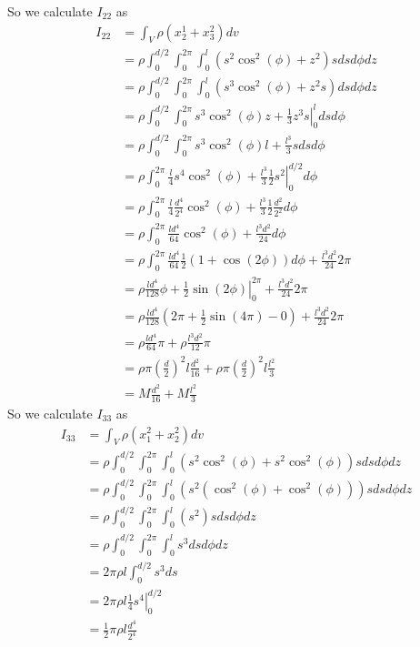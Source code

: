 \documentclass[11pt]{article}
\numberwithin{equation}{section}
\begin{document}
\begin{enumerate}[(a)]
So we calculate $I_{22}$ as
\begin{align*}
I_{22} &= \int_V\rho(x^1_2+x^2_3)dv\\
&= \rho\int_0^{d/2}\int_0^{2\pi}\int_0^l(s^2\cos^2(\phi)+z^2)sdsd\phi dz\\
&= \rho\int_0^{d/2}\int_0^{2\pi}\int_0^l(s^3\cos^2(\phi)+z^2s)dsd\phi dz\\
&= \rho\int_0^{d/2}\int_0^{2\pi}\left.s^3\cos^2(\phi)z+\frac{1}{3}z^3s\right|_0^ldsd\phi\\
&= \rho\int_0^{d/2}\int_0^{2\pi}\left.s^3\cos^2(\phi)l+\frac{l^3}{3}s\right.dsd\phi\\
&= \rho\int_0^{2\pi}\left.\frac{l}{4}s^4\cos^2(\phi)+\frac{l^3}{3}\frac{1}{2}s^2\right|_0^{d/2}d\phi\\
&= \rho\int_0^{2\pi}\left.\frac{l}{4}\frac{d^4}{2^4}\cos^2(\phi)+\frac{l^3}{3}\frac{1}{2}\frac{d^2}{2^2}\right.d\phi\\
&= \rho\int_0^{2\pi}\left.\frac{ld^4}{64}\cos^2(\phi)+\frac{l^3d^2}{24}\right.d\phi\\
&= \rho\int_0^{2\pi}\frac{ld^4}{64}\frac{1}{2}(1+\cos(2\phi))d\phi+\frac{l^3d^2}{24}2\pi\\
&= \rho\frac{ld^4}{128}\left.\phi+\frac{1}{2}\sin(2\phi)\right|_0^{2\pi}+\frac{l^3d^2}{24}2\pi\\
&= \rho\frac{ld^4}{128}\left(2\pi+\frac{1}{2}\sin(4\pi)-0\right)+\frac{l^3d^2}{24}2\pi\\
&= \rho\frac{ld^4}{64}\pi+\rho\frac{l^3d^2}{12}\pi\\
&= \rho\pi\left(\frac{d}{2}\right)^2l\frac{d^2}{16}+\rho\pi\left(\frac{d}{2}\right)^2l\frac{l^2}{3}\\
&= M\frac{d^2}{16}+M\frac{l^2}{3}
\end{align*}
So we calculate $I_{33}$ as
\begin{align*}
I_{33} &= \int_V\rho(x^2_1+x^2_2)dv\\
&= \rho\int_0^{d/2}\int_0^{2\pi}\int_0^l(s^2\cos^2(\phi)+s^2\cos^2(\phi))sdsd\phi dz\\
&= \rho\int_0^{d/2}\int_0^{2\pi}\int_0^l(s^2(\cos^2(\phi)+\cos^2(\phi)))sdsd\phi dz\\
&= \rho\int_0^{d/2}\int_0^{2\pi}\int_0^l(s^2)sdsd\phi dz\\
&= \rho\int_0^{d/2}\int_0^{2\pi}\int_0^ls^3dsd\phi dz\\
&= 2\pi\rho l\int_0^{d/2}s^3ds\\
&= 2\pi\rho l\left.\frac{1}{4}s^4\right|_0^{d/2}\\
&= \frac{1}{2}\pi\rho l\frac{d^4}{2^4}\\

\end{align*}
\end{enumerate}
\end{document}
